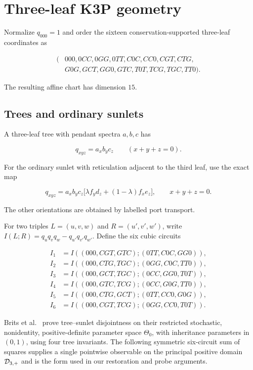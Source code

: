 \section{Three-leaf K3P geometry}\label{sec:three-leaf}

Normalize \(q_{000}=1\) and order the sixteen conservation-supported
three-leaf coordinates as

\begin{equation}\label{eq:three-order}
\begin{split}
(&000,0CC,0GG,0TT,C0C,CC0,CGT,CTG,\\
 &G0G,GCT,GG0,GTC,T0T,TCG,TGC,TT0).
\end{split}
\end{equation}

The resulting affine chart has dimension \(15\).

\subsection{Trees and ordinary sunlets}

A three-leaf tree with pendant spectra \(a,b,c\) has

\[
 q_{xyz}=a_xb_yc_z\qquad(x+y+z=0).
\]

For the ordinary sunlet with reticulation adjacent to the third leaf, use
the exact map

\begin{equation}\label{eq:sunlet-map}
 q_{xyz}=a_xb_yc_z
 \bigl[\lambda f_y d_z+(1-\lambda)f_xe_z\bigr],
 \qquad x+y+z=0.
\end{equation}

The other orientations are obtained by labelled port transport.

For two triples \(L=(u,v,w)\) and \(R=(u',v',w')\), write
\(I(L;R)=q_uq_vq_w-q_{u'}q_{v'}q_{w'}\).  Define the six cubic circuits

\begin{align*}
I_1&=I((000,CGT,GTC);(0TT,C0C,GG0)),\\
I_2&=I((000,CTG,TGC);(0GG,C0C,TT0)),\\
I_3&=I((000,GCT,TGC);(0CC,GG0,T0T)),\\
I_4&=I((000,GTC,TCG);(0CC,G0G,TT0)),\\
I_5&=I((000,CTG,GCT);(0TT,CC0,G0G)),\\
I_6&=I((000,CGT,TCG);(0GG,CC0,T0T)).
\end{align*}

Brits et al.~\cite[Lemma~4.2]{BritsEtAl2026} prove tree--sunlet disjointness
on their restricted stochastic, nonidentity, positive-definite parameter
space \(\Theta_0\), with inheritance parameters in \((0,1)\), using four tree
invariants.  The following symmetric six-circuit sum of squares supplies a
single pointwise observable on the principal positive domain \(\mathcal D_{3,+}\) and
is the form used in our restoration and probe arguments.

